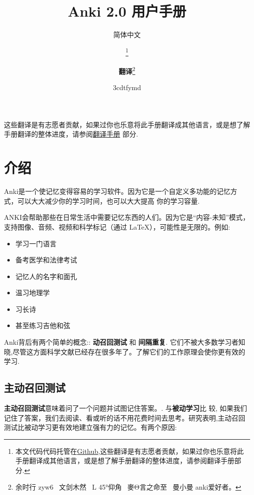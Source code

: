 \documentclass[a4paper]{book}
\title{Anki 2.0 用户手册}
\author{简体中文}
\title{\textbf{\savedtitle}}
\author{\textbf{\savedauthor}\thanks{本文代码代码托管在\href{https://github.com/xiaoleeza/Ankihelp}{Github},这些翻译是有志愿者贡献，如果过你也乐意将此手册翻译成其他语言，或是想了解手册翻译的整体进度，请参阅翻译手册部分.}\and \textbf{翻译}\thanks{\ttfamily 余时行
		zyw6~
		文剑木然~
		L
		45°\hspace{-.1ex}仰角~
		麥\hspace{-.07ex}Θ\hspace{-.07ex}言之命至~
		曼小曼
		anki\hspace{-.07ex}爱好者。}}
\date{\w3cdtfymd}
\makeatletter
\let\savedauthor=\@author
\let\savedtitle=\@title
\newcounter{tab}[chapter]
\makeatother
\begin{document}
	\frontmatter
	\maketitle
	\thispagestyle{empty}
	\setcounter{tocdepth}{4}
	\tableofcontents\newpage\thispagestyle{empty}
	
	\mainmatter
	\fancyhf{}
	\fancyhead[LE]{{\small\leftmark}}
	\fancyhead[RO]{{\small\rightmark}}
	\fancyhead[RE,LO]{{\small\savedauthor\hspace*{1ex}\textbf{\savedtitle}}}
	\fancyfoot[LE,RO]{\small\textbf\thepage}
	\pagestyle{fancy}
	
	
	这些翻译是有志愿者贡献，如果过你也乐意将此手册翻译成其他语言，或是想了解手册翻译的整体进度，请参阅\hyperref[translatingmanual]{翻译手册} 部分.
	
	\chapter{介绍}
	
	Anki是一个使记忆变得容易的学习软件。因为它是一个自定义多功能的记忆方式，可以大大减少你的学习时间，也可以大大提高 你的学习容量.
	
	ANKI会帮助那些在日常生活中需要记忆东西的人们。因为它是“内容-未知”模式，支持图像、音频、视频和科学标记（通过 LaTeX），可能性是无限的。例如:
	
	\begin{itemize}
		\itemsep1pt\parskip0pt
		\item 学习一门语言
		\item 备考医学和法律考试
		\item 记忆人的名字和面孔
		\item 温习地理学
		\item 习长诗
		\item 甚至练习吉他和弦
	\end{itemize}
	
	Anki背后有两个简单的概念:: \textbf{动召回测试 }和 \textbf{间隔重复}. 它们不被大多数学习者知晓,尽管这方面科学文献已经存在很多年了。了解它们的工作原理会使你更有效的学习.
	
	\section{主动召回测试}
	\textbf{主动召回测试}意味着问了一个问题并试图记住答案。. 与\textbf{被动学习}比 较, 如果我们记住了答案，我们去阅读、看或听的话不用花费时间去思考。研究表明,主动召回测试比被动学习更有效地建立强有力的记忆。有两个原因:
	
\end{document}
